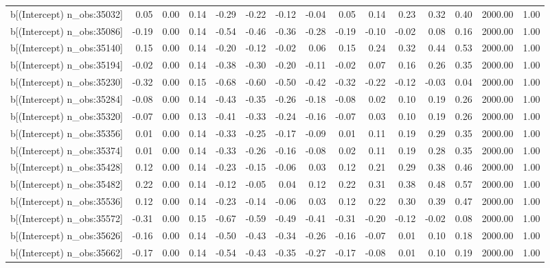 \begin{table}[ht]
\begin{tabular}{rrrrrrrrrrrrrrr}
  b[(Intercept) n\_obs:35032] & 0.05 & 0.00 & 0.14 & -0.29 & -0.22 & -0.12 & -0.04 & 0.05 & 0.14 & 0.23 & 0.32 & 0.40 & 2000.00 & 1.00 \\ 
  b[(Intercept) n\_obs:35086] & -0.19 & 0.00 & 0.14 & -0.54 & -0.46 & -0.36 & -0.28 & -0.19 & -0.10 & -0.02 & 0.08 & 0.16 & 2000.00 & 1.00 \\ 
  b[(Intercept) n\_obs:35140] & 0.15 & 0.00 & 0.14 & -0.20 & -0.12 & -0.02 & 0.06 & 0.15 & 0.24 & 0.32 & 0.44 & 0.53 & 2000.00 & 1.00 \\ 
  b[(Intercept) n\_obs:35194] & -0.02 & 0.00 & 0.14 & -0.38 & -0.30 & -0.20 & -0.11 & -0.02 & 0.07 & 0.16 & 0.26 & 0.35 & 2000.00 & 1.00 \\ 
  b[(Intercept) n\_obs:35230] & -0.32 & 0.00 & 0.15 & -0.68 & -0.60 & -0.50 & -0.42 & -0.32 & -0.22 & -0.12 & -0.03 & 0.04 & 2000.00 & 1.00 \\ 
  b[(Intercept) n\_obs:35284] & -0.08 & 0.00 & 0.14 & -0.43 & -0.35 & -0.26 & -0.18 & -0.08 & 0.02 & 0.10 & 0.19 & 0.26 & 2000.00 & 1.00 \\ 
  b[(Intercept) n\_obs:35320] & -0.07 & 0.00 & 0.13 & -0.41 & -0.33 & -0.24 & -0.16 & -0.07 & 0.03 & 0.10 & 0.19 & 0.26 & 2000.00 & 1.00 \\ 
  b[(Intercept) n\_obs:35356] & 0.01 & 0.00 & 0.14 & -0.33 & -0.25 & -0.17 & -0.09 & 0.01 & 0.11 & 0.19 & 0.29 & 0.35 & 2000.00 & 1.00 \\ 
  b[(Intercept) n\_obs:35374] & 0.01 & 0.00 & 0.14 & -0.33 & -0.26 & -0.16 & -0.08 & 0.02 & 0.11 & 0.19 & 0.28 & 0.35 & 2000.00 & 1.00 \\ 
  b[(Intercept) n\_obs:35428] & 0.12 & 0.00 & 0.14 & -0.23 & -0.15 & -0.06 & 0.03 & 0.12 & 0.21 & 0.29 & 0.38 & 0.46 & 2000.00 & 1.00 \\ 
  b[(Intercept) n\_obs:35482] & 0.22 & 0.00 & 0.14 & -0.12 & -0.05 & 0.04 & 0.12 & 0.22 & 0.31 & 0.38 & 0.48 & 0.57 & 2000.00 & 1.00 \\ 
  b[(Intercept) n\_obs:35536] & 0.12 & 0.00 & 0.14 & -0.23 & -0.14 & -0.06 & 0.03 & 0.12 & 0.22 & 0.30 & 0.39 & 0.47 & 2000.00 & 1.00 \\ 
  b[(Intercept) n\_obs:35572] & -0.31 & 0.00 & 0.15 & -0.67 & -0.59 & -0.49 & -0.41 & -0.31 & -0.20 & -0.12 & -0.02 & 0.08 & 2000.00 & 1.00 \\ 
  b[(Intercept) n\_obs:35626] & -0.16 & 0.00 & 0.14 & -0.50 & -0.43 & -0.34 & -0.26 & -0.16 & -0.07 & 0.01 & 0.10 & 0.18 & 2000.00 & 1.00 \\ 
  b[(Intercept) n\_obs:35662] & -0.17 & 0.00 & 0.14 & -0.54 & -0.43 & -0.35 & -0.27 & -0.17 & -0.08 & 0.01 & 0.10 & 0.19 & 2000.00 & 1.00 \\ 

\end{tabular}
\end{table}
